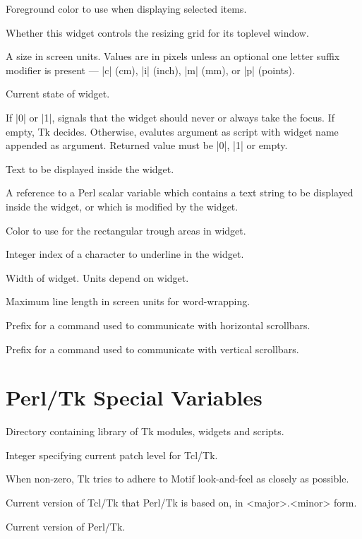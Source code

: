 \begin{enum}{1cm}
Foreground color to use when displaying selected items.

Whether this widget controls the resizing grid for its 
toplevel  window.

A size in screen units. Values are in pixels unless an optional one letter
suffix modifier is present --- |c| (cm), |i| (inch), |m| (mm), or |p|
(points).

Current state of widget.

If |0| or |1|, signals that the widget should never or always take the focus.
If empty, Tk decides. Otherwise, evalutes argument as script with widget
name appended as argument. Returned value must be |0|, |1| or empty.

Text to be displayed inside the  widget.

A reference to a Perl scalar variable which contains a text string to be displayed inside
the widget, or which is modified by the widget.

Color to use for the rectangular trough areas in widget.

Integer  index  of  a  character to underline in the widget.

Width of widget. Units depend on widget.

Maximum  line  length in screen units for word-wrapping.

Prefix for a command used to communicate with horizontal scrollbars.

Prefix for a command used to communicate with vertical scrollbars.

\end{enum}

\section{Perl/Tk Special Variables}

\begin{enum}{1cm}
 
Directory containing library of Tk modules, widgets and scripts.

Integer specifying current patch level for Tcl/Tk.

When non-zero, Tk tries to adhere to Motif look-and-feel as closely
as possible.

Current version of Tcl/Tk that Perl/Tk is based on, in <major>.<minor> form.

Current version of Perl/Tk.

\end{enum}

